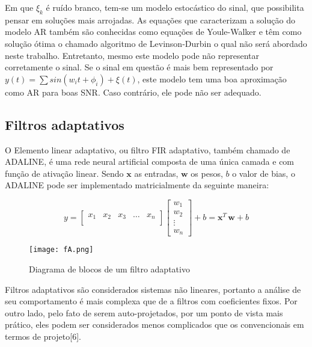 Em que $\xi_k$ é ruído branco, tem-se um modelo estocástico do sinal, que possibilita pensar em soluções mais arrojadas. As equações que caracterizam a solução do modelo AR também são conhecidas como equações de Youle-Walker e têm como solução ótima o chamado algoritmo de Levinson-Durbin \cite{huang2001spoken} o qual não será abordado neste trabalho. Entretanto, mesmo este modelo pode não representar corretamente o sinal. Se o sinal em questão é mais bem representado por $y(t)=\sum sin(w_it+\phi_i)+\xi(t)$, este modelo tem uma boa aproximação como AR para boas SNR. Caso contrário, ele pode não ser adequado.

\subsection{Filtros adaptativos}

\indent O Elemento linear adaptativo, ou filtro FIR adaptativo, também chamado de ADALINE, é uma rede neural artificial composta de uma única camada e com função de ativação linear. Sendo $\boldsymbol{x}$ as entradas, $\boldsymbol{w}$ os pesos, $b$ o valor de bias, o ADALINE pode ser implementado matricialmente da seguinte maneira:


\begin{equation}
y=
\begin{bmatrix}
x_{1} & x_{2} & x_{3} & \dots & x_{n} \\
\end{bmatrix}
\begin{bmatrix}
w_{1}  \\
w_{2}  \\
\vdots  \\
w_{n} 
\end{bmatrix}
+ b = \boldsymbol{x}^T \, \boldsymbol{w}+b
\end{equation}

\begin{figure}[h]
	\centering
	\texttt{[image: fA.png]}
	\caption{Diagrama de blocos de um filtro adaptativo}
	\label{fig:filtroAdaptativo}
\end{figure}

\indent Filtros adaptativos são considerados sistemas não lineares, portanto a análise de seu comportamento é mais complexa que de a filtros com coeficientes fixos. Por outro lado, pelo fato de serem auto-projetados, por um ponto de vista mais prático, eles podem ser considerados menos complicados que os convencionais em termos de projeto[6].

